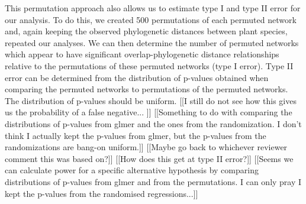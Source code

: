 \documentclass[12pt]{article}
\begin{document}
\begin{spacing}{1.5}
  This permutation approach also allows us to estimate type I and type II 
  error for our analysis. To do this, we created 500 permutations of each 
  permuted network and, again keeping the observed phylogenetic distances 
  between plant species, repeated our analyses. We can then determine the 
  number of permuted networks which appear to have significant 
  overlap-phylogenetic distance relationships relative to the permutations 
  of these permuted networks (type I error). Type II error can be determined
  from the distribution of p-values obtained when comparing the permuted 
  networks to permutations of the permuted networks. The distribution of 
  p-values should be uniform. [[I still do not see how this gives us the
  probability of a false negative... ]] [[Something to do with comparing
  the distributions of p-values from glmer and the ones from the randomization.
  I don't think I actually kept the p-values from glmer, but the p-values from
  the randomizations are bang-on uniform.]]
  [[Maybe go back to whichever reviewer comment this was based on?]]
  [[How does this get at type II error?]] 
  [[Seems we can calculate power for a specific alternative hypothesis by
  comparing distributions of p-values from glmer and from the permutations.
  I can only pray I kept the p-values from the randomised regressions...]]



\end{spacing}
\end{document}

